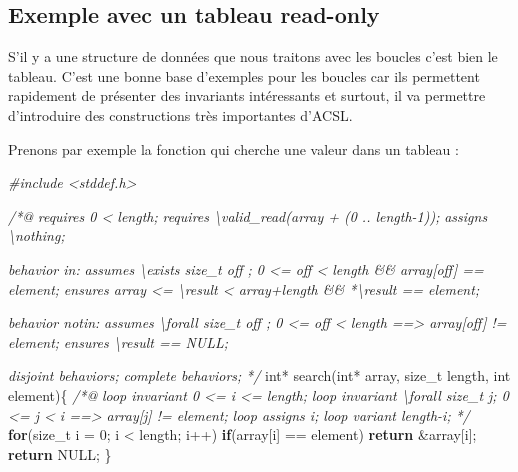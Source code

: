 \documentclass[12pt,francais,]{scrbook}
\newenvironment{Shaded}{}{}
\newcommand{\KeywordTok}[1]{\textcolor[rgb]{0.00,0.44,0.13}{\textbf{{#1}}}}
\newcommand{\DataTypeTok}[1]{\textcolor[rgb]{0.56,0.13,0.00}{{#1}}}
\newcommand{\DecValTok}[1]{\textcolor[rgb]{0.25,0.63,0.44}{{#1}}}
\newcommand{\CommentTok}[1]{\textcolor[rgb]{0.38,0.63,0.69}{\textit{{#1}}}}
\newcommand{\NormalTok}[1]{{#1}}
\begin{document}
\subsection{Exemple avec un tableau
read-only}\label{exemple-avec-un-tableau-read-only}

S'il y a une structure de données que nous traitons avec les boucles
c'est bien le tableau. C'est une bonne base d'exemples pour les boucles
car ils permettent rapidement de présenter des invariants intéressants
et surtout, il va permettre d'introduire des constructions très
importantes d'ACSL.

Prenons par exemple la fonction qui cherche une valeur dans un tableau :

\begin{footnotesize}\begin{Shaded}
\begin{Highlighting}[]
\CommentTok{#include <stddef.h>}

\CommentTok{/*@}
\CommentTok{  requires 0 < length;}
\CommentTok{  requires \textbackslash{}valid_read(array + (0 .. length-1));}
\CommentTok{  }
\CommentTok{  assigns  \textbackslash{}nothing;}

\CommentTok{  behavior in:}
\CommentTok{    assumes \textbackslash{}exists size_t off ; 0 <= off < length && array[off] == element;}
\CommentTok{    ensures array <= \textbackslash{}result < array+length && *\textbackslash{}result == element;}

\CommentTok{  behavior notin:}
\CommentTok{    assumes \textbackslash{}forall size_t off ; 0 <= off < length ==> array[off] != element;}
\CommentTok{    ensures \textbackslash{}result == NULL;}

\CommentTok{  disjoint behaviors;}
\CommentTok{  complete behaviors;}
\CommentTok{*/}
\DataTypeTok{int}\NormalTok{* search(}\DataTypeTok{int}\NormalTok{* array, size_t length, }\DataTypeTok{int} \NormalTok{element)\{}
  \CommentTok{/*@}
\CommentTok{    loop invariant 0 <= i <= length;}
\CommentTok{    loop invariant \textbackslash{}forall size_t j; 0 <= j < i ==> array[j] != element;}
\CommentTok{    loop assigns i;}
\CommentTok{    loop variant length-i;}
\CommentTok{  */} 
  \KeywordTok{for}\NormalTok{(size_t i = }\DecValTok{0}\NormalTok{; i < length; i++)}
    \KeywordTok{if}\NormalTok{(array[i] == element) }\KeywordTok{return} \NormalTok{&array[i];}
  \KeywordTok{return} \NormalTok{NULL;}
\NormalTok{\}}
\end{Highlighting}
\end{Shaded}\end{footnotesize}
\end{document}

